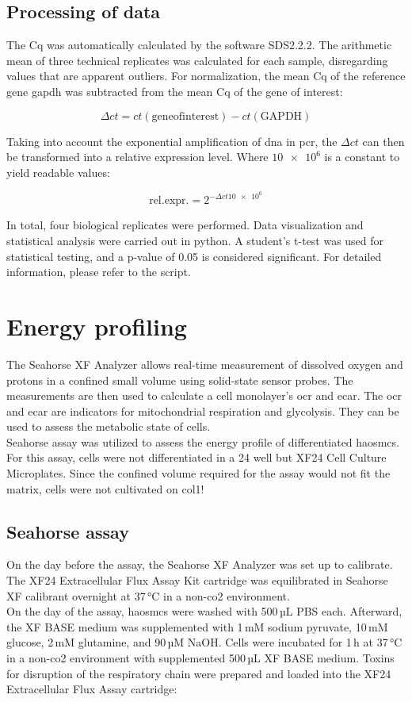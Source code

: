     \subsection{Processing of data}
    The \ac{Cq} was automatically calculated by the software SDS2.2.2. The arithmetic mean of three technical replicates was calculated for each sample, disregarding values that are apparent outliers. For normalization, the mean \ac{Cq} of the reference gene \ac{gapdh} was subtracted from the mean \ac{Cq} of the gene of interest:

    $$\Delta ct = ct(\mathrm{gene of interest}) - ct(\mathrm{GAPDH})$$

    Taking into account the exponential amplification of \ac{dna} in \ac{pcr}, the $\Delta ct$ can then be transformed into a relative expression level. Where $\num{10e6}$ is a constant to yield readable values:

    $$\mathrm{rel. expr.} = 2^{-\Delta ct\num{10e6}}$$

    In total, four biological replicates were performed. Data visualization and statistical analysis were carried out in python. A student's t-test was used for statistical testing, and a p-value of 0.05 is considered significant. For detailed information, please refer to the script.

\section{Energy profiling}
\label{sec:seahorse}
The Seahorse XF Analyzer allows real-time measurement of dissolved oxygen and protons in a confined small volume using solid-state sensor probes. The measurements are then used to calculate a cell monolayer's \ac{ocr} and \ac{ecar}. The \ac{ocr} and \ac{ecar} are indicators for mitochondrial respiration and glycolysis. They can be used to assess the metabolic state of cells. \cite{agilenttechnologiesincHowAgilentSeahorse2022}\\
Seahorse assay was utilized to assess the energy profile of differentiated \acp{haosmc}. For this assay, cells were not differentiated in a \ac{24 well} but XF24 Cell Culture Microplates. Since the confined volume required for the assay would not fit the matrix, cells were not cultivated on \ac{col1}!

    \subsection{Seahorse assay}
    On the day before the assay, the Seahorse XF Analyzer was set up to calibrate. The XF24 Extracellular Flux Assay Kit cartridge was equilibrated in Seahorse XF calibrant overnight at 37\,°C in a non-\ac{co2} environment.\\
    On the day of the assay, \acp{haosmc} were washed with 500\,µL PBS each. Afterward, the XF BASE medium was supplemented with 1\,mM sodium pyruvate, 10\,mM glucose, 2\,mM glutamine, and 90\,µM NaOH. Cells were incubated for 1\,h at 37\,°C in a non-\ac{co2} environment with supplemented 500\,µL XF BASE medium. Toxins for disruption of the respiratory chain were prepared and loaded into the XF24 Extracellular Flux Assay cartridge:

